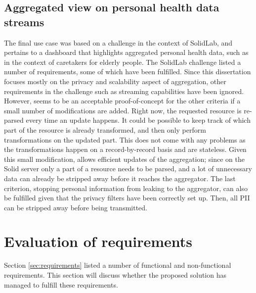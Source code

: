 \subsection{Aggregated view on personal health data streams}
The final use case was based on a challenge in the context of SolidLab, and pertains
to a dashboard that highlights aggregated personal health data, such as in the context of caretakers for elderly people. The SolidLab challenge listed a number of requirements, some of which have been fulfilled. Since this dissertation focuses mostly on the privacy and scalability aspect of aggregation, other requirements in the challenge such as streaming capabilities have been ignored.
However, \middleware{} seems to be an acceptable proof-of-concept for the other criteria if a small number of modifications are added. Right now, the requested resource is re-parsed every time an update happens. It could be possible to keep track of which part of the resource is already transformed, and then only perform transformations on the updated part. This does not come with any problems as the transformations happen on a record-by-record basis and are stateless. Given this small modification, \middleware{} allows efficient updates of the aggregation; since on the Solid server only a part of a resource needs to be parsed, and a lot of unnecessary data can already be stripped away before it reaches the aggregator. 
The last criterion, stopping personal information from leaking to the aggregator, can also be fulfilled given that the privacy filters have been correctly set up. Then, all \gls{PII} can be stripped away before being transmitted.

\section{Evaluation of requirements}
Section \ref{sec:requirements} listed a number of functional and non-functional requirements. This section will discuss whether the proposed solution has managed to fulfill these requirements.

